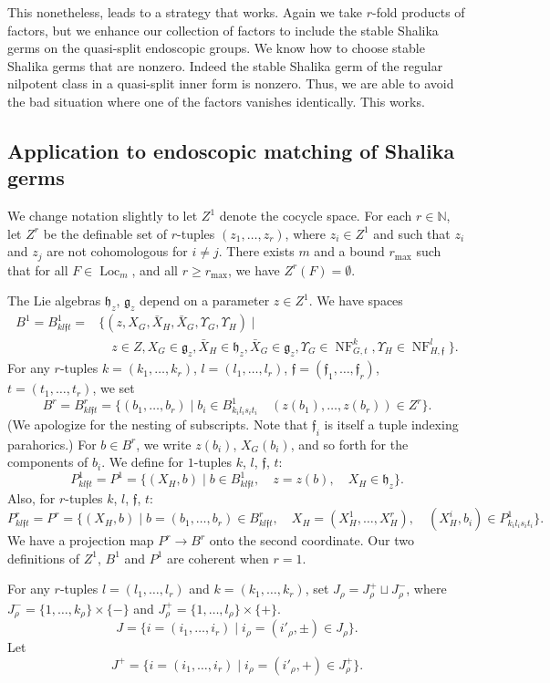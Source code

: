 \documentclass[12pt]{amsart}
\newcommand{\op}[1]{\operatorname{#1}}
\newcommand{\ring}[1]{{\mathbb #1}}
\def\NF{\op{NF}}
\def\Y{\Upsilon}
\def\s{{\mathfrak{f}}}
\newcommand{\fg}{\mathfrak{g}}
\newcommand{\fh}{\mathfrak{h}}
\theoremstyle{plain}
\theoremstyle{definition}
\begin{document}
This nonetheless, leads to a strategy that works.  Again we take
$r$-fold products of factors, but we enhance our collection of factors
to include the stable Shalika germs on the quasi-split endoscopic
groups.  We know how to choose stable Shalika germs that are nonzero.
Indeed the stable Shalika germ of the regular nilpotent class in a
quasi-split inner form is
nonzero.  Thus, we are able to avoid the bad situation where one of
the factors vanishes identically.  This works.

\subsection{Application to endoscopic matching of Shalika germs}

We change notation slightly to let $Z^1$ denote the
cocycle space.  For each $r\in\ring{N}$, let $Z^r$ be the definable
set of $r$-tuples $(z_1,\ldots,z_r)$, where $z_i \in Z^1$ and such
that $z_i$ and $z_j$ are not cohomologous for $i\ne j$.  There exists
$m$ and a bound $r_{\op{max}}$ such that for all $F\in \op{Loc}_m$,
and all $r\ge r_{\op{max}}$, we have $Z^r(F) = \emptyset$.

The Lie algebras $\fh_z$, $\fg_z$ depend on a parameter $z\in Z^1$.
We have spaces
\begin{align*}
B^1 = B^1_{kl\s t} = &\{(z,X_G,\bar X_H,\bar X_G,\Y_G,\Y_H) \mid \\
     &\quad z\in Z, X_G\in \fg_z,
\bar X_H \in \fh_z, \bar X_G\in \fg_z, \Y_G\in \NF^k_{G,t}, \Y_H\in \NF^l_{H,\s}\}.
\end{align*}
For any $r$-tuples $k=(k_1,\ldots,k_r)$, $l=(l_1,\ldots,l_r)$,
$\s = (\s_1,\ldots,\s_r)$, $t=(t_1,\ldots,t_r)$, we set
\[
B^r = B^r_{kl\s t} = \{(b_1,\ldots,b_r) \mid b_i \in B^1_{k_il_is_it_i}\quad
  (z(b_1),\ldots,z(b_r))\in Z^r \}.
\]
(We apologize for the nesting of subscripts.  Note that $\s_i$ is
itself a tuple indexing parahorics.)  For $b\in B^r$, we write
$z(b_i)$, $X_G(b_i)$, and so forth for the components of $b_i$.  We
define for $1$-tuples $k$, $l$, $\s$, $t$:
\[
P^1_{kl\s t} = P^1 = \{(X_H,b) \mid b\in B^1_{kl\s t},
\quad z = z(b),\quad X_H \in \fh_z\}.
\]
Also, for $r$-tuples $k$, $l$, $\s$, $t$:
\[
P^r_{kl\s t} = P^r = \{(X_H,b) \mid b = (b_1,\ldots,b_r)\in B^r_{kl\s t},\quad
  X_H = (X_H^1,\ldots,X_H^r), \quad (X_H^i,b_i) \in P^1_{k_il_is_it_i}\}.
\]
We have a projection map $P^r\to B^r$ onto the second coordinate.
Our two definitions of $Z^1$, $B^1$ and $P^1$ are coherent when
$r=1$.

For any $r$-tuples $l=(l_1,\ldots,l_r)$ and $k=(k_1,\ldots,k_r)$, set
$J_\rho = J^+_\rho\sqcup J^-_\rho$, where $J^-_\rho =
\{1,\ldots,k_\rho\}\times\{-\}$ and $J^+_\rho =
\{1,\ldots,l_\rho\}\times\{+\}$.
\[
J = \{i = (i_1,\ldots,i_r)\mid i_\rho=(i'_\rho,\pm)\in J_\rho\}.
\]
Let
\[
J^+ = \{i = (i_1,\ldots,i_r)\mid i_\rho=(i'_\rho,+)\in J^+_\rho\}.
\]
\end{document}
